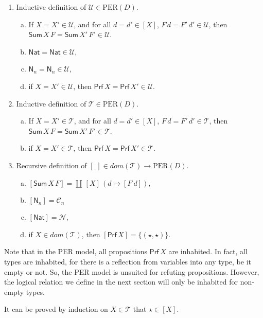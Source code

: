 \documentclass{LMCS}
\theoremstyle{plain}\newtheorem{satz}[thm]{Satz}
\newcommand{\natty}{\mathsf{Nat}}
\newcommand{\sigD}[2]{\coprod\,#1\,#2}
\newcommand{\dom}{\mathit{dom}}
\newcommand{\vdom}{\dom}
\newcommand{\perD}{\mbox{PER}(D)}
\newcommand{\perU}{\mathcal{U}}
\newcommand{\perT}{\mathcal{T}}
\newcommand{\iDs}[2]{\mathsf{Sum}\,#1\,#2}
\newcommand{\dprf}{\star}
\newcommand{\prf}[1]{\mathsf{Prf}\,#1}
\newcommand{\enumD}[1]{\mathsf{N}_{#1}}
\newcommand{\C}[1]{\ensuremath{\mathcal{C}_{#1}}}
\newcommand{\iNat}{\natty}
\newcommand{\perNat}{\mathcal{N}}
\begin{document}
{\begin{defi}[Extension of $\perU$ and $\perT$]\hfill
\begin{enumerate}[(1)]
 \item Inductive definition of $\perU \in \perD$.
  \begin{enumerate}[(a)]
  \item If $X = X' \in \perU$, and for all $d = d' \in [X]$, $F\,d =
    F'\,d' \in \perU$, then
    $\iDs{X}{F} =\iDs{X'}{F'} \in \perU$.
  \item $\iNat = \iNat \in \perU$,
  \item $\enumD{n} = \enumD{n} \in \perU$,
  \item if $X = X' \in \perU$, then $\prf{X} = \prf{X'} \in \perU$.
  \end{enumerate}
\item Inductive definition of $\perT \in \perD$.
  \begin{enumerate}[(a)]
  \item If $X = X' \in \perT$, and for all $d = d' \in [X]$, $F\,d =
    F'\,d' \in \perT$, then $\iDs{X}{F} = \iDs{X'}{F'}\in \perT$.
  \item if $X = X' \in \perT$, then $\prf{X} = \prf{X'} \in \perT$.
  \end{enumerate}
\item Recursive definition of $[\_] \in \vdom(\perT) \to \perD$.
  \begin{enumerate}[(a)]
\item $[\iDs{X}{F}] = \sigD{[X]}{(d\mapsto [F\ d])}$,
  \item $[\enumD{n}] = \C n$ 
\item $[\iNat] = \perNat$,
  \item if $X \in \dom(\perT)$, then $[\prf{X}] = \{(\dprf,\dprf)\}$.
  \end{enumerate}
\end{enumerate}
\end{defi}\medskip

\noindent Note that in the PER model, all propositions $\prf{X}$ are inhabited.
In fact, all types are inhabited, for there is a reflection from
variables into any type, be it empty or not.  So, the PER model is
unsuited for refuting propositions.  However, the logical relation we
define in the next section will only be inhabited for non-empty types.

\begin{rem}
  It can be proved by induction on $X\in\perT$ that $\dprf\in [X]$.
\end{rem}

}
\end{document}
